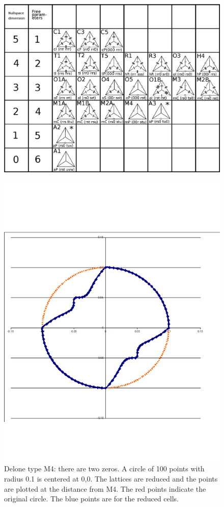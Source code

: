 \documentclass[preprint]{iucr}              %
\begin{document}
	\begin{figure}
		\caption{}
		\label{fig:degenerate}
		\includegraphics[width=12cm]{NullSpaceDistribution}
	\end{figure}
	
	\begin{figure}
		\label{fig:M4}
		\caption{Delone type M4: there are two zeros. A circle of 100 points with
			radius 0.1 is centered at 0,0. The lattices are reduced and the points are
			plotted at the distance from M4. The red points indicate the original
		circle. The blue points are for the reduced cells.}
		\includegraphics[width=12cm]{M4-100-2-zeros}
	\end{figure}
	
\end{document}
